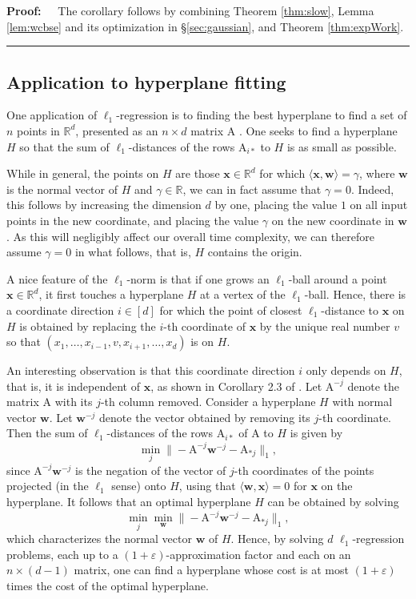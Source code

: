 \documentclass[11pt]{article}
\newenvironment{proof}{\begin{trivlist} \item {\bf Proof:~~}}
  {\qed\end{trivlist}}
\newcommand{\mat}[1]{{\ensuremath{\bm{\mathrm{#1}}}}}
\def\matA{\mat{A}}
\def\w{{\mathbf{w}}}
\def\qed{\hfill\rule{2mm}{2mm}}
\def\x{{\mathbf x}}
\newcommand{\eps}{\varepsilon}
\begin{document}
\begin{proof}
The corollary follows by combining Theorem \ref{thm:slow}, Lemma \ref{lem:wcbse} and its optimization 
in \S\ref{sec:gaussian}, and 
Theorem \ref{thm:expWork}. 
\end{proof}

\subsection{Application to hyperplane fitting}\label{sec:hyperplane}
One application of $\ell_1$-regression is to finding the best hyperplane to find a 
set of $n$ points in $\mathbb{R}^d$, presented as an $n \times d$ matrix $\matA$ 
\cite{bd09L1,bdb10,kk03,kk05,sw11,CDMMMW13}. 
One seeks
to find a hyperplane $H$ so that the sum of $\ell_1$-distances of the rows $\matA_{i*}$ to
$H$ is as small as possible. 

While in general, the points on $H$ are those $\x \in \mathbb{R}^d$ for which $\langle \x, \w \rangle = \gamma$,
where $\w$ is the normal vector of $H$ and $\gamma \in \mathbb{R}$, we can in fact assume that 
$\gamma = 0$. Indeed, this follows by increasing the dimension $d$ by one, placing the value $1$ on
all input points in the new coordinate, and placing the value $\gamma$ on the new coordinate in $\w$. As
this will negligibly affect our overall time complexity, we can therefore assume $\gamma = 0$ in what
follows, that is, $H$ contains the origin. 

A nice feature of the $\ell_1$-norm is that if one grows an $\ell_1$-ball around a point $\x \in \mathbb{R}^d$,
it first touches a hyperplane $H$ at a vertex of the $\ell_1$-ball. Hence, there is a coordinate
direction $i \in [d]$ for which the point of closest $\ell_1$-distance to $\x$ on $H$ is obtained by
replacing the $i$-th coordinate of $\x$ by the unique real number $v$ so that 
$(x_1, \ldots, x_{i-1}, v, x_{i+1}, \ldots, x_d)$ is on $H$. 

An interesting observation is that this coordinate direction $i$ only depends on $H$, that is,
it is independent of $\x$, as shown in Corollary 2.3 of \cite{m97}. Let $\matA^{-j}$ denote the matrix
$\matA$ with its $j$-th column removed. Consider a hyperplane $H$ with normal vector $\w$. Let $\w^{-j}$
denote the vector obtained by removing its $j$-th coordinate. Then the
sum of $\ell_1$-distances of the rows $\matA_{i*}$ of $\matA$ to $H$ is given by
$$\min_j \|-\matA^{-j} \w^{-j} - \matA_{*j}\|_1,$$
since $\matA^{-j} \w^{-j}$ is the negation of the vector of $j$-th coordinates of the points projected
(in the $\ell_1$ sense) onto $H$, using that $\langle \w, \x \rangle = 0$ 
for $\x$ on the hyperplane. It follows that an optimal
hyperplane $H$ can be obtained by solving
$$\min_j \min_{\w} \|-\matA^{-j} \w^{-j} -\matA_{*j}\|_1,$$
which characterizes the normal vector $\w$ of $H$. Hence, by solving $d$ $\ell_1$-regression problems,
each up to a $(1+\eps)$-approximation factor and each on an $n \times (d-1)$ matrix, 
one can find a hyperplane whose cost is at most $(1+\eps)$ times the cost of the optimal hyperplane.
\end{document}
